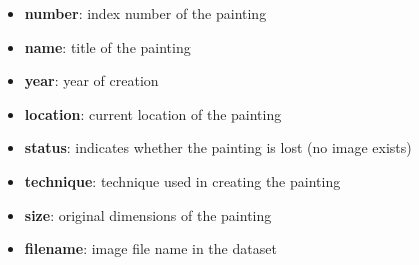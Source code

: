 \documentclass[a4paper,12pt]{article}
\begin{document}
\begin{itemize}
    \item \textbf{number}: index number of the painting
    \item \textbf{name}: title of the painting
    \item \textbf{year}: year of creation
    \item \textbf{location}: current location of the painting
    \item \textbf{status}: indicates whether the painting is lost (no image exists)
    \item \textbf{technique}: technique used in creating the painting
    \item \textbf{size}: original dimensions of the painting
    \item \textbf{filename}: image file name in the dataset
\end{itemize}
\end{document}
